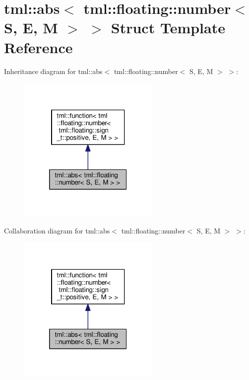 \hypertarget{structtml_1_1abs_3_01tml_1_1floating_1_1number_3_01_s_00_01_e_00_01_m_01_4_01_4}{\section{tml\+:\+:abs$<$ tml\+:\+:floating\+:\+:number$<$ S, E, M $>$ $>$ Struct Template Reference}
\label{structtml_1_1abs_3_01tml_1_1floating_1_1number_3_01_s_00_01_e_00_01_m_01_4_01_4}
}


Inheritance diagram for tml\+:\+:abs$<$ tml\+:\+:floating\+:\+:number$<$ S, E, M $>$ $>$\+:
\nopagebreak
\begin{figure}[H]
\begin{center}
\leavevmode
\includegraphics[width=194pt]{structtml_1_1abs_3_01tml_1_1floating_1_1number_3_01_s_00_01_e_00_01_m_01_4_01_4__inherit__graph}
\end{center}
\end{figure}


Collaboration diagram for tml\+:\+:abs$<$ tml\+:\+:floating\+:\+:number$<$ S, E, M $>$ $>$\+:
\nopagebreak
\begin{figure}[H]
\begin{center}
\leavevmode
\includegraphics[width=194pt]{structtml_1_1abs_3_01tml_1_1floating_1_1number_3_01_s_00_01_e_00_01_m_01_4_01_4__coll__graph}
\end{center}
\end{figure}
